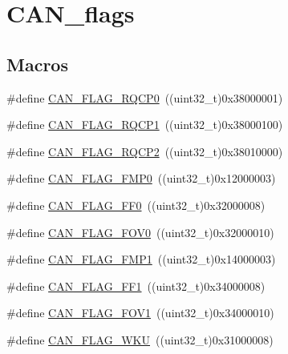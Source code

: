 \hypertarget{group___c_a_n__flags}{}\section{C\+A\+N\+\_\+flags}
\label{group___c_a_n__flags}
\subsection*{Macros}
\begin{DoxyCompactItemize}
\item 
\#define \mbox{\hyperlink{group___c_a_n__flags_ga6df0579049eb471720ea103c5446298b}{C\+A\+N\+\_\+\+F\+L\+A\+G\+\_\+\+R\+Q\+C\+P0}}~((uint32\+\_\+t)0x38000001)
\item 
\#define \mbox{\hyperlink{group___c_a_n__flags_gaba705586ebc3d961507436c03a2feaba}{C\+A\+N\+\_\+\+F\+L\+A\+G\+\_\+\+R\+Q\+C\+P1}}~((uint32\+\_\+t)0x38000100)
\item 
\#define \mbox{\hyperlink{group___c_a_n__flags_ga9c20cd47e558135bd7ae71149583d487}{C\+A\+N\+\_\+\+F\+L\+A\+G\+\_\+\+R\+Q\+C\+P2}}~((uint32\+\_\+t)0x38010000)
\item 
\#define \mbox{\hyperlink{group___c_a_n__flags_ga4b40574700edfe752433bb4e0d457c64}{C\+A\+N\+\_\+\+F\+L\+A\+G\+\_\+\+F\+M\+P0}}~((uint32\+\_\+t)0x12000003)
\item 
\#define \mbox{\hyperlink{group___c_a_n__flags_ga11648741ff43af1561ce7009698fb797}{C\+A\+N\+\_\+\+F\+L\+A\+G\+\_\+\+F\+F0}}~((uint32\+\_\+t)0x32000008)
\item 
\#define \mbox{\hyperlink{group___c_a_n__flags_ga2abd66b5e0032132673208decd2d01f2}{C\+A\+N\+\_\+\+F\+L\+A\+G\+\_\+\+F\+O\+V0}}~((uint32\+\_\+t)0x32000010)
\item 
\#define \mbox{\hyperlink{group___c_a_n__flags_ga5d4b7376954a059fbd74ed8d688f6657}{C\+A\+N\+\_\+\+F\+L\+A\+G\+\_\+\+F\+M\+P1}}~((uint32\+\_\+t)0x14000003)
\item 
\#define \mbox{\hyperlink{group___c_a_n__flags_ga0fa967743c5db04189bb2160aa48e371}{C\+A\+N\+\_\+\+F\+L\+A\+G\+\_\+\+F\+F1}}~((uint32\+\_\+t)0x34000008)
\item 
\#define \mbox{\hyperlink{group___c_a_n__flags_gac1af6e61b1285ddc4658c4bcc152719a}{C\+A\+N\+\_\+\+F\+L\+A\+G\+\_\+\+F\+O\+V1}}~((uint32\+\_\+t)0x34000010)
\item 
\#define \mbox{\hyperlink{group___c_a_n__flags_ga18c72dbe75cb80e8b5126c23c9120818}{C\+A\+N\+\_\+\+F\+L\+A\+G\+\_\+\+W\+KU}}~((uint32\+\_\+t)0x31000008)
\item 

\end{DoxyCompactItemize}
